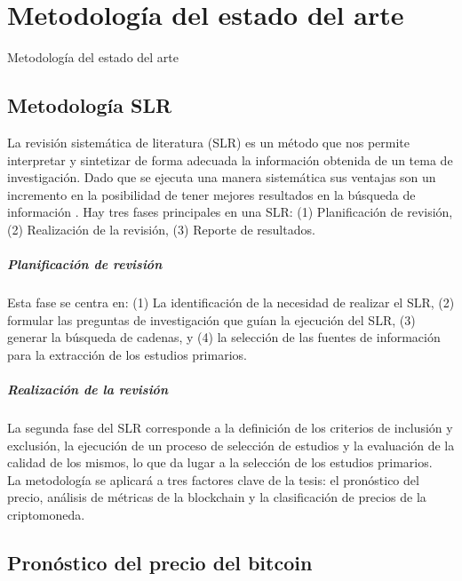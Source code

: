 \chapter[Metodología del estado del arte]{Metodología del estado del arte}{Metodología del estado del arte}\label{appen3}
\renewcommand{\tablename}{Tabla}


\section{Metodología SLR}

La revisión sistemática de literatura (SLR) es un método que nos permite interpretar y sintetizar de forma adecuada la información obtenida de un tema de investigación. Dado que se ejecuta una manera sistemática sus ventajas son un incremento en la posibilidad de tener mejores resultados en la búsqueda de información \cite{kitchenhamSystematicLiteratureReviews2009}. Hay tres fases principales en una SLR: (1) Planificación de revisión, (2) Realización de la revisión, (3) Reporte de resultados.

\paragraph{Planificación de revisión}

Esta fase se centra en: (1) La identificación de la necesidad de realizar el SLR, (2) formular las preguntas de investigación que guían la ejecución del SLR, (3) generar la búsqueda de cadenas, y (4) la selección de las fuentes de información para la extracción de los estudios primarios.

\paragraph{Realización de la revisión}

La segunda fase del SLR corresponde a la definición de los criterios de inclusión y exclusión, la ejecución de un proceso de selección de estudios y la evaluación de la calidad de los mismos, lo que da lugar a la selección de los estudios primarios.\\

La metodología se aplicará a tres factores clave de la tesis: el pronóstico del precio, análisis de métricas de la blockchain y la clasificación de precios de la criptomoneda. 


\section{Pronóstico del precio del bitcoin}

